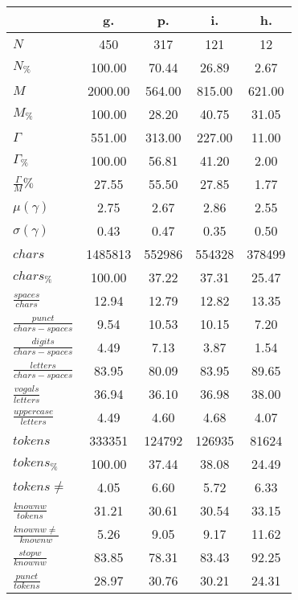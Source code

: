 \begin{table}[h!]
\begin{center}
\begin{tabular}{| l || c | c | c | c |}\hline
 & {\bf g.} & {\bf p.} & {\bf i.} & {\bf h.} \\\hline\hline
$N$ & 450  & 317  & 121  & 12 \\
$N_{\%}$ & 100.00  & 70.44  & 26.89  & 2.67 \\\hline
$M$ & 2000.00  & 564.00  & 815.00  & 621.00 \\
$M_{\%}$ & 100.00  & 28.20  & 40.75  & 31.05 \\\hline
$\Gamma$ & 551.00  & 313.00  & 227.00  & 11.00 \\
$\Gamma_{\%}$ & 100.00  & 56.81  & 41.20  & 2.00 \\\hline
$\frac{\Gamma}{M}\%$ & 27.55  & 55.50  & 27.85  & 1.77 \\
$\mu(\gamma)$ & 2.75  & 2.67  & 2.86  & 2.55 \\
$\sigma(\gamma)$ & 0.43  & 0.47  & 0.35  & 0.50 \\\hline\hline
$chars$ & 1485813  & 552986  & 554328  & 378499 \\
$chars_{\%}$ & 100.00  & 37.22  & 37.31  & 25.47 \\\hline
$\frac{spaces}{chars}$ & 12.94  & 12.79  & 12.82  & 13.35 \\
$\frac{punct}{chars-spaces}$ & 9.54  & 10.53  & 10.15  & 7.20 \\
$\frac{digits}{chars-spaces}$ & 4.49  & 7.13  & 3.87  & 1.54 \\\hline
$\frac{letters}{chars-spaces}$ & 83.95  & 80.09  & 83.95  & 89.65 \\
$\frac{vogals}{letters}$ & 36.94  & 36.10  & 36.98  & 38.00 \\
$\frac{uppercase}{letters}$ & 4.49  & 4.60  & 4.68  & 4.07 \\\hline\hline
$tokens$ & 333351  & 124792  & 126935  & 81624 \\
$tokens_{\%}$ & 100.00  & 37.44  & 38.08  & 24.49 \\
$tokens \neq$ & 4.05  & 6.60  & 5.72  & 6.33 \\\hline
$\frac{knownw}{tokens}$ & 31.21  & 30.61  & 30.54  & 33.15 \\
$\frac{knownw \neq}{knownw}$ & 5.26  & 9.05  & 9.17  & 11.62 \\\hline
$\frac{stopw}{knownw}$ & 83.85  & 78.31  & 83.43  & 92.25 \\
$\frac{punct}{tokens}$ & 28.97  & 30.76  & 30.21  & 24.31 \\

\end{tabular}
\end{center}
\end{table}
